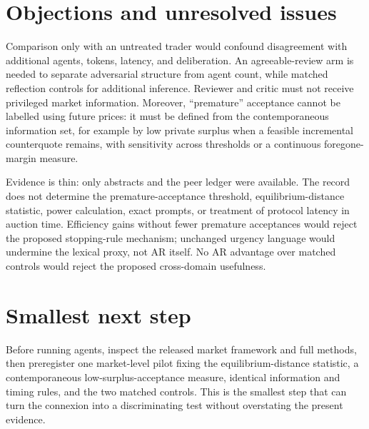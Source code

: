 \documentclass{article}
\begin{document}
\section{Objections and unresolved issues}

Comparison only with an untreated trader would confound disagreement with additional agents, tokens, latency, and deliberation.  An agreeable-review arm is needed to separate adversarial structure from agent count, while matched reflection controls for additional inference.  Reviewer and critic must not receive privileged market information.  Moreover, ``premature'' acceptance cannot be labelled using future prices: it must be defined from the contemporaneous information set, for example by low private surplus when a feasible incremental counterquote remains, with sensitivity across thresholds or a continuous foregone-margin measure. 

Evidence is thin: only abstracts and the peer ledger were available.  The record does not determine the premature-acceptance threshold, equilibrium-distance statistic, power calculation, exact prompts, or treatment of protocol latency in auction time.  Efficiency gains without fewer premature acceptances would reject the proposed stopping-rule mechanism; unchanged urgency language would undermine the lexical proxy, not AR itself.  No AR advantage over matched controls would reject the proposed cross-domain usefulness. 

\section{Smallest next step}

Before running agents, inspect the released market framework and full methods, then preregister one market-level pilot fixing the equilibrium-distance statistic, a contemporaneous low-surplus-acceptance measure, identical information and timing rules, and the two matched controls.  This is the smallest step that can turn the connexion into a discriminating test without overstating the present evidence. 
\end{document}
